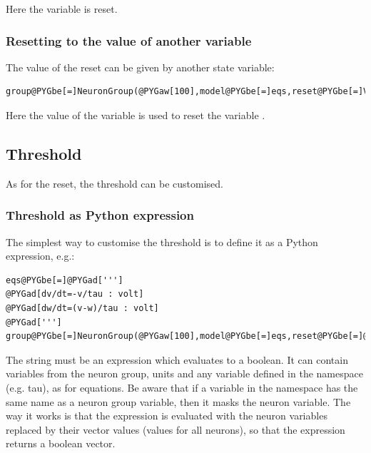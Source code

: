\documentclass[letterpaper,10pt,english]{manual}
\begin{document}
Here the variable  is reset.


\subsubsection{Resetting to the value of another variable}

The value of the reset can be given by another state variable:

\begin{Verbatim}[commandchars=@\[\]]
group@PYGbe[=]NeuronGroup(@PYGaw[100],model@PYGbe[=]eqs,reset@PYGbe[=]VariableReset(@PYGaw[0]@PYGbe[*]mV,state@PYGbe[=]@PYGad[']@PYGad[v]@PYGad['],resetvaluestate@PYGbe[=]@PYGad[']@PYGad[w]@PYGad[']),threshold@PYGbe[=]@PYGaw[10]@PYGbe[*]mV)
\end{Verbatim}

Here the value of the variable  is used to reset the variable .


\subsection{Threshold}

As for the reset, the threshold can be customised.


\subsubsection{Threshold as Python expression}

The simplest way to customise the threshold is to define it as a Python expression, e.g.:

\begin{Verbatim}[commandchars=@\[\]]
eqs@PYGbe[=]@PYGad[''']
@PYGad[dv/dt=-v/tau : volt]
@PYGad[dw/dt=(v-w)/tau : volt]
@PYGad[''']
group@PYGbe[=]NeuronGroup(@PYGaw[100],model@PYGbe[=]eqs,reset@PYGbe[=]@PYGaw[0]@PYGbe[*]mV,threshold@PYGbe[=]@PYGad["]@PYGad[v@textgreater[]=w]@PYGad["])
\end{Verbatim}

The string must be an expression which evaluates to a boolean. It can
contain variables from the neuron group, units and any variable defined in the namespace
(e.g. tau), as for equations. Be aware that if a variable in the namespace has the same
name as a neuron group variable, then it masks the neuron variable. The way it works is that
the expression is evaluated with the neuron variables replaced by their vector values (values for
all neurons), so that the expression returns a boolean vector.
\end{document}
